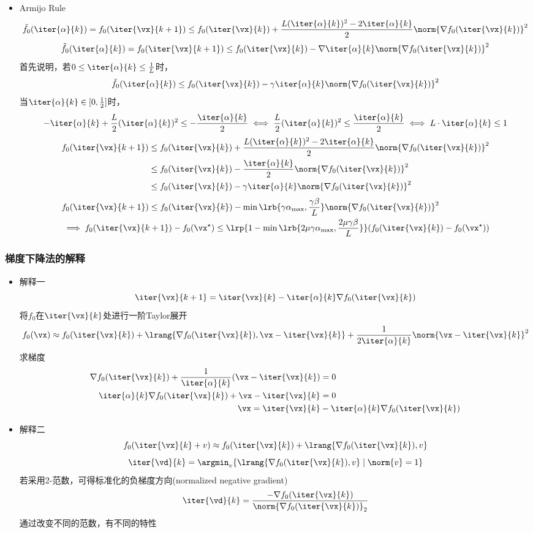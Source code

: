 \begin{itemize}
\item Armijo Rule
\[\tilde{f}_0(\iter{\alpha}{k})=f_0(\iter{\vx}{k+1})\leq f_0(\iter{\vx}{k})+\frac{L(\iter{\alpha}{k})^2-2\iter{\alpha}{k}}{2}\norm{\nabla f_0(\iter{\vx}{k})}^2\]
\[\tilde{f}_0(\iter{\alpha}{k})=f_0(\iter{\vx}{k+1})\leq f_0(\iter{\vx}{k})-\nabla\iter{\alpha}{k}\norm{\nabla f_0(\iter{\vx}{k})}^2\]
首先说明，若$0\leq\iter{\alpha}{k}\leq\frac{1}{L}$时，
\[\tilde{f}_0(\iter{\alpha}{k})\leq f_0(\iter{\vx}{k})-\gamma\iter{\alpha}{k}\norm{\nabla f_0(\iter{\vx}{k})}^2\]
当$\iter{\alpha}{k}\in[0,\frac{1}{2}]$时，
\[-\iter{\alpha}{k}+\frac{L}{2}(\iter{\alpha}{k})^2\leq -\frac{\iter{\alpha}{k}}{2}\iff \frac{L}{2}(\iter{\alpha}{k})^2\leq\frac{\iter{\alpha}{k}}{2}\iff L\cdot\iter{\alpha}{k}\leq 1\]
\[\begin{aligned}
    f_0(\iter{\vx}{k+1})&\leq f_0(\iter{\vx}{k})+\frac{L(\iter{\alpha}{k})^2-2\iter{\alpha}{k}}{2}\norm{\nabla f_0(\iter{\vx}{k})}^2\\
    &\leq f_0(\iter{\vx}{k})-\frac{\iter{\alpha}{k}}{2}\norm{\nabla f_0(\iter{\vx}{k})}^2\\
    &\leq f_0(\iter{\vx}{k})-\gamma\iter{\alpha}{k}\norm{\nabla f_0(\iter{\vx}{k})}^2
\end{aligned}\]
\[\begin{aligned}
    &f_0(\iter{\vx}{k+1})\leq f_0(\iter{\vx}{k})-\min\lrb{\gamma\alpha_{\max},\frac{\gamma\beta}{L}}\norm{\nabla f_0(\iter{\vx}{k})}^2\\
    &\implies f_0(\iter{\vx}{k+1})-f_0(\vx^\star)\leq\lrp{1-\min\lrb{2\mu\gamma\alpha_{\max},\frac{2\mu\gamma\beta}{L}}}(f_0(\iter{\vx}{k})-f_0(\vx^\star))
\end{aligned}\]
\end{itemize}

\subsubsection{梯度下降法的解释}
\begin{itemize}
\item 解释一
\[\iter{\vx}{k+1}=\iter{\vx}{k}-\iter{\alpha}{k}\nabla f_0(\iter{\vx}{k})\]
将$f_0$在$\iter{\vx}{k}$处进行一阶Taylor展开
\[f_0(\vx)\approx f_0(\iter{\vx}{k})+\lrang{\nabla f_0(\iter{\vx}{k}),\vx-\iter{\vx}{k}}+\frac{1}{2\iter{\alpha}{k}}\norm{\vx-\iter{\vx}{k}}^2\]
求梯度
\[\begin{aligned}
    \nabla f_0(\iter{\vx}{k})+\frac{1}{\iter{\alpha}{k}}(\vx-\iter{\vx}{k})&=0\\
    \iter{\alpha}{k}\nabla f_0(\iter{\vx}{k})+\vx-\iter{\vx}{k}&=0\\
    \vx=\iter{\vx}{k}&-\iter{\alpha}{k}\nabla f_0(\iter{\vx}{k})
\end{aligned}\]

\item 解释二
\[f_0(\iter{\vx}{k}+v)\approx f_0(\iter{\vx}{k})+\lrang{\nabla f_0(\iter{\vx}{k}),v}\]
\[\iter{\vd}{k}=\argmin_v\{\lrang{\nabla f_0(\iter{\vx}{k}),v}\mid \norm{v}=1\}\]
若采用2-范数，可得标准化的负梯度方向(normalized negative gradient)
\[\iter{\vd}{k}=\frac{-\nabla f_0(\iter{\vx}{k})}{\norm{\nabla f_0(\iter{\vx}{k})}_2}\]
通过改变不同的范数，有不同的特性
\end{itemize}


